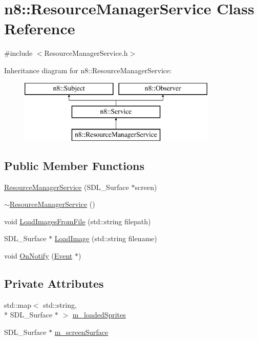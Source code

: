 \hypertarget{classn8_1_1_resource_manager_service}{\section{n8\-:\-:Resource\-Manager\-Service Class Reference}
\label{classn8_1_1_resource_manager_service}
}


{\ttfamily \#include $<$Resource\-Manager\-Service.\-h$>$}

Inheritance diagram for n8\-:\-:Resource\-Manager\-Service\-:\begin{figure}[H]
\begin{center}
\leavevmode
\includegraphics[height=3.000000cm]{classn8_1_1_resource_manager_service}
\end{center}
\end{figure}
\subsection*{Public Member Functions}
\begin{DoxyCompactItemize}
\item 
\hyperlink{classn8_1_1_resource_manager_service_a96e9074b770e268e038daf0d2afb20dc}{Resource\-Manager\-Service} (S\-D\-L\-\_\-\-Surface $\ast$screen)
\item 
\hyperlink{classn8_1_1_resource_manager_service_ac9aea35cebd03445c5bd0bc07e45289c}{$\sim$\-Resource\-Manager\-Service} ()
\item 
void \hyperlink{classn8_1_1_resource_manager_service_ad104d496f6e1dc61ed12895ed9989fe5}{Load\-Images\-From\-File} (std\-::string filepath)
\item 
S\-D\-L\-\_\-\-Surface $\ast$ \hyperlink{classn8_1_1_resource_manager_service_afb39562b3a9448d73eaf5e3041e52011}{Load\-Image} (std\-::string filename)
\item 
void \hyperlink{classn8_1_1_resource_manager_service_a0c5bb1ec14fea9971e8fec2efe8d56cd}{On\-Notify} (\hyperlink{classn8_1_1_event}{Event} $\ast$)
\end{DoxyCompactItemize}
\subsection*{Private Attributes}
\begin{DoxyCompactItemize}
\item 
std\-::map$<$ std\-::string, \\*
S\-D\-L\-\_\-\-Surface $\ast$ $>$ \hyperlink{classn8_1_1_resource_manager_service_af203735b1015f5cf94024e8857c8c17d}{m\-\_\-loaded\-Sprites}
\item 
S\-D\-L\-\_\-\-Surface $\ast$ \hyperlink{classn8_1_1_resource_manager_service_a430459934276e8fd19f5501c04569ab5}{m\-\_\-screen\-Surface}
\end{DoxyCompactItemize}


